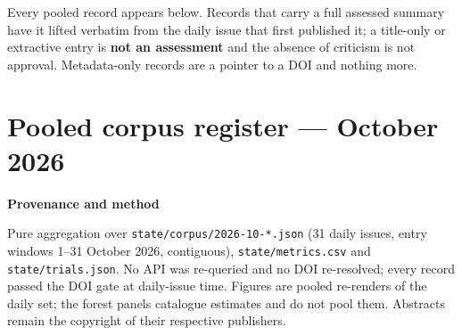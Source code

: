 \documentclass[10pt]{article}
\begin{document}
\footnotesize
Every pooled record appears below. Records that carry a full assessed summary have it lifted
verbatim from the daily issue that first published it; a title-only or extractive entry is
\textbf{not an assessment} and the absence of criticism is not approval. Metadata-only records are a
pointer to a DOI and nothing more.

\vspace{3mm}



\clearpage

\section*{\sffamily\bfseries\color{Deep}Pooled corpus register --- October 2026}
\vspace{-1.5mm}{\color{Coral}\rule{\linewidth}{1.1pt}}\vspace{2.5mm}



\vspace{3mm}

\begin{keybox}
{\sffamily\bfseries\footnotesize\color{Deep}Provenance and method}\\[1.2mm]
{\fontsize{7.2}{8.8}\selectfont
Pure aggregation over \texttt{state/corpus/2026-10-*.json} (31 daily issues, entry windows 1--31
October 2026, contiguous), \texttt{state/metrics.csv} and \texttt{state/trials.json}. No API was
re-queried and no DOI re-resolved; every record passed the DOI gate at daily-issue time. Figures are
pooled re-renders of the daily set; the forest panels catalogue estimates and do not pool them.
Abstracts remain the copyright of their respective publishers.\par}
\end{keybox}
\end{document}
